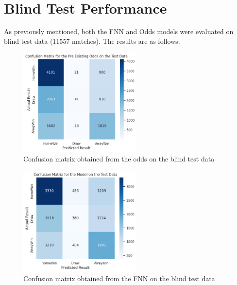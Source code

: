 \documentclass[rgb,listoffigures,listoftables,final]{cam-thesis}
\begin{document}
    \section{Blind Test Performance}
    As previously mentioned, both the FNN and Odds models were evaluated on blind test data (11557 matches). The results are as follows:
    \begin{figure}[H]
        \centering
        \includegraphics[width=0.55\textwidth]{figures/cm_existing_odds_testing.png}
        \caption{Confusion matrix obtained from the odds on the blind test data}
        \label{fig:cm-odds-testing}
    \end{figure}

    \begin{figure}[H]
        \centering
        \includegraphics[width=0.55\textwidth]{figures/cm_model_testing.png}
        \caption{Confusion matrix obtained from the FNN on the blind test data}
        \label{fig:cm-odds-testing}
    \end{figure}
\end{document}
